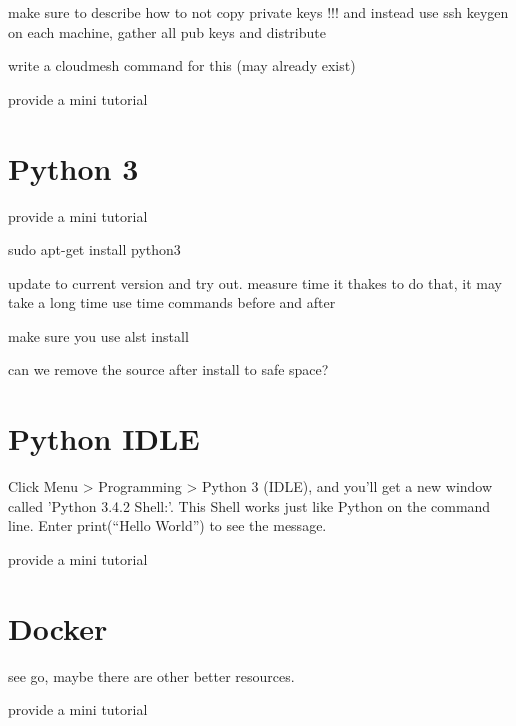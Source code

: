 \begin{exercise}
make sure to describe how to not copy private keys !!! and instead use
ssh keygen on each machine, gather all pub keys and distribute

write a cloudmesh command for this (may already exist) 
\end{exercise}



\begin{exercise}
provide a mini tutorial 
\end{exercise}




\section{Python 3}

\begin{exercise}
provide a mini tutorial 
\end{exercise}

sudo apt-get install python3

update to current version and try out. measure time it thakes to do that, it may take a long time use time commands before and after

make sure you use alst install


can we remove the source after install to safe space?

\section{Python IDLE}

Click Menu > Programming > Python 3 (IDLE), and you'll get a new
window called 'Python 3.4.2 Shell:'. This Shell works just like Python
on the command line. Enter print(``Hello World'') to see the message.

\begin{exercise}
provide a mini tutorial 
\end{exercise}


\section{Docker}

see go, maybe there are other better resources.

\begin{exercise}
provide a mini tutorial 
\end{exercise}

